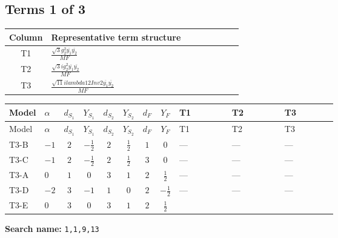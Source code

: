 \documentclass[8pt]{article}
\begin{document}
\begin{landscape}
\subsection*{Terms 1 of 3}
\begin{center}
\begin{tabular}{@{}c >{\raggedright\arraybackslash}p{0.82\linewidth}@{}}
\toprule
Column & Representative term structure \\
\midrule
T1 & \(\displaystyle \frac{\sqrt{3} g_{2}^{2} \overline{y_{1}} \overline{y_{2}}}{MF}\) \\
\midrule
T2 & \(\displaystyle \frac{\sqrt{3} i g_{2}^{2} \overline{y_{1}} \overline{y_{2}}}{MF}\) \\
\midrule
T3 & \(\displaystyle \frac{\sqrt{11} i lambda12Inv2 \overline{y_{1}} \overline{y_{2}}}{MF}\) \\
\midrule
\bottomrule
\end{tabular}
\end{center}
\smallskip
\tiny
\begin{longtable}{@{}llcccccc >{\raggedright\arraybackslash}p{0.21\linewidth} >{\raggedright\arraybackslash}p{0.21\linewidth} >{\raggedright\arraybackslash}p{0.21\linewidth}@{}}
\toprule
Model & $\alpha$ & $d_{S_1}$ & $Y_{S_1}$ & $d_{S_2}$ & $Y_{S_2}$ & $d_F$ & $Y_F$ & T1 & T2 & T3 \\
\midrule
\endfirsthead
\toprule
Model & $\alpha$ & $d_{S_1}$ & $Y_{S_1}$ & $d_{S_2}$ & $Y_{S_2}$ & $d_F$ & $Y_F$ & T1 & T2 & T3 \\
\midrule
\endhead
T3-B & $-1$ & $2$ & $-\frac{1}{2}$ & $2$ & $\frac{1}{2}$ & $1$ & $0$ & --- & --- & --- \\
\midrule
T3-C & $-1$ & $2$ & $-\frac{1}{2}$ & $2$ & $\frac{1}{2}$ & $3$ & $0$ & --- & --- & --- \\
\midrule
T3-A & $0$ & $1$ & $0$ & $3$ & $1$ & $2$ & $\frac{1}{2}$ & --- & --- & --- \\
\midrule
T3-D & $-2$ & $3$ & $-1$ & $1$ & $0$ & $2$ & $-\frac{1}{2}$ & --- & --- & --- \\
\midrule
T3-E & $0$ & $3$ & $0$ & $3$ & $1$ & $2$ & $\frac{1}{2}$ & \scriptsize\adjustbox{max width=\linewidth}{$\begin{gathered} - \frac{\sqrt{3} g_{2}^{2} \overline{y_{1}} \overline{y_{2}}}{6 MF}\end{gathered}$} & \scriptsize\adjustbox{max width=\linewidth}{$\begin{gathered} - \frac{49 \sqrt{3} i g_{2}^{2} \overline{y_{1}} \overline{y_{2}}}{24 MF}\end{gathered}$} & \scriptsize\adjustbox{max width=\linewidth}{$\begin{gathered} - \frac{3 \sqrt{11} i lambda12Inv2 \overline{y_{1}} \overline{y_{2}}}{22 MF}\end{gathered}$} \\
\midrule
\bottomrule
\end{longtable}
\clearpage
\noindent\textbf{Search name: }\texttt{1,1,9,13}\par\smallskip

\end{landscape}
\end{document}
